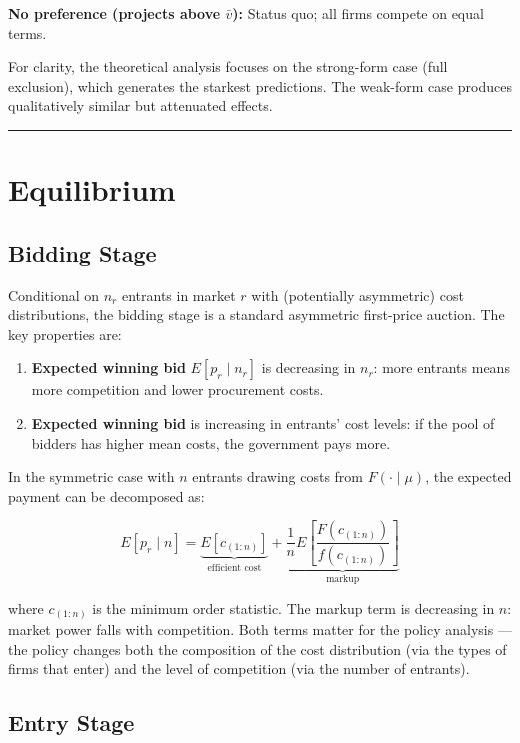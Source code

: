 \documentclass[10pt]{article}
\begin{document}
\medskip
\noindent\textbf{No preference (projects above $\bar{v}$):} Status quo; all firms compete on equal terms.

\medskip
For clarity, the theoretical analysis focuses on the strong-form case (full exclusion), which generates the starkest predictions. The weak-form case produces qualitatively similar but attenuated effects.

\bigskip\hrule\bigskip

\section{Equilibrium}

\subsection{Bidding Stage}

Conditional on $n_r$ entrants in market $r$ with (potentially asymmetric) cost distributions, the bidding stage is a standard asymmetric first-price auction. The key properties are:

\begin{enumerate}
  \item \textbf{Expected winning bid} $E[p_r \mid n_r]$ is decreasing in $n_r$: more entrants means more competition and lower procurement costs.
  \item \textbf{Expected winning bid} is increasing in entrants' cost levels: if the pool of bidders has higher mean costs, the government pays more.
\end{enumerate}

In the symmetric case with $n$ entrants drawing costs from $F(\cdot \mid \mu)$, the expected payment can be decomposed as:

\[
  E[p_r \mid n]
    = \underbrace{E[c_{(1:n)}]}_{\text{efficient cost}}
    + \underbrace{\frac{1}{n} E\!\left[\frac{F(c_{(1:n)})}{f(c_{(1:n)})}\right]}_{\text{markup}}
\]

where $c_{(1:n)}$ is the minimum order statistic. The markup term is decreasing in $n$: market power falls with competition. Both terms matter for the policy analysis --- the policy changes both the composition of the cost distribution (via the types of firms that enter) and the level of competition (via the number of entrants).

\subsection{Entry Stage}
\end{document}
